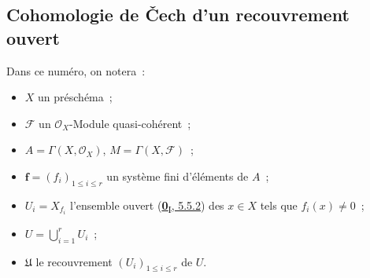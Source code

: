 \subsection{Cohomologie de Čech d'un recouvrement ouvert}
\label{subsection:III.1.2-fr}

\begin{notation}[1.2.1]
\label{III.1.2.1-fr}
Dans ce numéro, on notera~:
\begin{itemize}
\item $X$ un préschéma~;
\item $\mathcal F$ un $\mathcal O_X$-Module quasi-cohérent~;
\item $A=\Gamma(X,\mathcal O_X)$, $M=\Gamma(X,\mathcal F)$~;
\item $\mathbf f=(f_i)_{1\leq i\leq r}$ un système fini d'éléments de $A$~;
\item $U_i=X_{f_i}$ l'ensemble ouvert
(\hyperref[0.5.5.2-fr]{\textbf{0}\textsubscript{I}, 5.5.2}) des $x\in X$ tels que
$f_i(x)\neq0$~;
\item $U=\bigcup_{i=1}^r U_i$~;
\item $\mathfrak U$ le recouvrement $(U_i)_{1\leq i\leq r}$ de $U$.
\end{itemize}
\end{notation}

